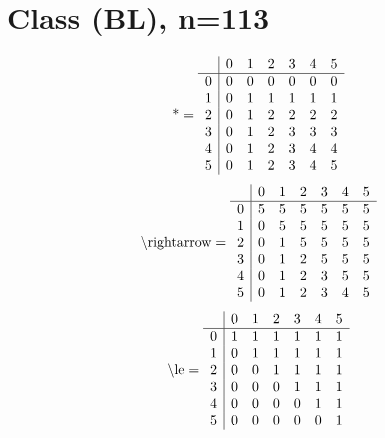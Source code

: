 \documentclass[11pt]{article}
\begin{document}
\section{Class (BL), n=113}
\[\text{*} = 
\begin{array}{r | r r r r r r}
 & 0 & 1 & 2 & 3 & 4 & 5 \\ \hline
0 & 0 & 0 & 0 & 0 & 0 & 0 \\
1 & 0 & 1 & 1 & 1 & 1 & 1 \\
2 & 0 & 1 & 2 & 2 & 2 & 2 \\
3 & 0 & 1 & 2 & 3 & 3 & 3 \\
4 & 0 & 1 & 2 & 3 & 4 & 4 \\
5 & 0 & 1 & 2 & 3 & 4 & 5 \\
\end{array}
\]
\[\text{\textbackslash rightarrow} = 
\begin{array}{r | r r r r r r}
 & 0 & 1 & 2 & 3 & 4 & 5 \\ \hline
0 & 5 & 5 & 5 & 5 & 5 & 5 \\
1 & 0 & 5 & 5 & 5 & 5 & 5 \\
2 & 0 & 1 & 5 & 5 & 5 & 5 \\
3 & 0 & 1 & 2 & 5 & 5 & 5 \\
4 & 0 & 1 & 2 & 3 & 5 & 5 \\
5 & 0 & 1 & 2 & 3 & 4 & 5 \\
\end{array}
\]
\[\text{\textbackslash le} = 
\begin{array}{r | r r r r r r}
 & 0 & 1 & 2 & 3 & 4 & 5 \\ \hline
0 & 1 & 1 & 1 & 1 & 1 & 1 \\
1 & 0 & 1 & 1 & 1 & 1 & 1 \\
2 & 0 & 0 & 1 & 1 & 1 & 1 \\
3 & 0 & 0 & 0 & 1 & 1 & 1 \\
4 & 0 & 0 & 0 & 0 & 1 & 1 \\
5 & 0 & 0 & 0 & 0 & 0 & 1 \\
\end{array}
\]
\end{document}
